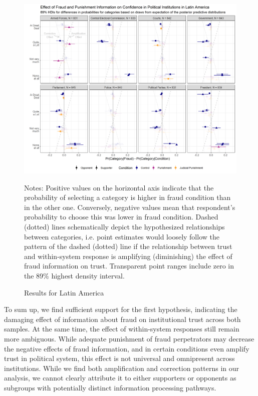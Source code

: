 \documentclass[11pt, ngerman,english,a4]{article}
\begin{document}
\begin{figure}
    \centering
    \includegraphics[width=\linewidth,trim=4 4 4 4,clip]{figs/la_hdi89_conditional.png}
    \caption{Results for Latin America}
    \singlespacing
    \raggedright
    \footnotesize{Notes: Positive values on the horizontal axis indicate that the probability of selecting a category is higher in fraud condition than in the other one. Conversely, negative values mean that respondent's probability to choose this was lower in fraud condition. Dashed (dotted) lines schematically depict the hypothesized relationships between categories, i.e. point estimates would loosely follow the pattern of the dashed (dotted) line if the relationship between trust and within-system response is amplifying (diminishing) the effect of fraud information on trust. Transparent point ranges include zero in the 89\% highest density interval.} 
    \label{fig:het-la}
    \end{figure}

To sum up, we find sufficient support for the first hypothesis, indicating the damaging effect of information about fraud on institutional trust across both samples. At the same time, the effect of within-system responses still remain more ambiguous. While adequate punishment of fraud perpetrators may decrease the negative effects of fraud information, and in certain conditions even amplify trust in political system, this effect is not universal and omnipresent across institutions. While we find both amplification and correction patterns in our analysis, we cannot clearly attribute it to either supporters or opponents as subgroups with potentially distinct information processing pathways.
\end{document}
